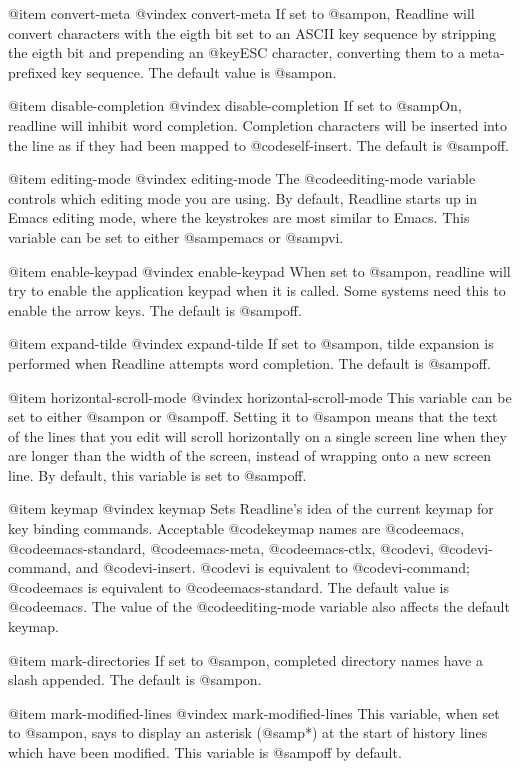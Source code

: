 @item convert-meta
@vindex convert-meta
If set to @samp{on}, Readline will convert characters with the
eigth bit set to an ASCII key sequence by stripping the eigth
bit and prepending an @key{ESC} character, converting them to a
meta-prefixed key sequence.  The default value is @samp{on}.

@item disable-completion
@vindex disable-completion
If set to @samp{On}, readline will inhibit word completion.
Completion  characters will be inserted into the line as if they had
been mapped to @code{self-insert}.  The default is @samp{off}.

@item editing-mode
@vindex editing-mode
The @code{editing-mode} variable controls which editing mode you are
using.  By default, Readline starts up in Emacs editing mode, where
the keystrokes are most similar to Emacs.  This variable can be
set to either @samp{emacs} or @samp{vi}.

@item enable-keypad
@vindex enable-keypad
When set to @samp{on}, readline will try to enable the application
keypad when it is called.  Some systems need this to enable the
arrow keys.  The default is @samp{off}.

@item expand-tilde
@vindex expand-tilde
If set to @samp{on}, tilde expansion is performed when Readline
attempts word completion.  The default is @samp{off}.

@item horizontal-scroll-mode
@vindex horizontal-scroll-mode
This variable can be set to either @samp{on} or @samp{off}.  Setting it
to @samp{on} means that the text of the lines that you edit will scroll
horizontally on a single screen line when they are longer than the width
of the screen, instead of wrapping onto a new screen line.  By default,
this variable is set to @samp{off}.

@item keymap
@vindex keymap
Sets Readline's idea of the current keymap for key binding commands.
Acceptable @code{keymap} names are
@code{emacs},
@code{emacs-standard},
@code{emacs-meta},
@code{emacs-ctlx},
@code{vi},
@code{vi-command}, and
@code{vi-insert}.
@code{vi} is equivalent to @code{vi-command}; @code{emacs} is
equivalent to @code{emacs-standard}.  The default value is @code{emacs}.
The value of the @code{editing-mode} variable also affects the
default keymap.

@item mark-directories
If set to @samp{on}, completed directory names have a slash
appended.  The default is @samp{on}.

@item mark-modified-lines
@vindex mark-modified-lines
This variable, when set to @samp{on}, says to display an asterisk
(@samp{*}) at the start of history lines which have been modified.
This variable is @samp{off} by default.

